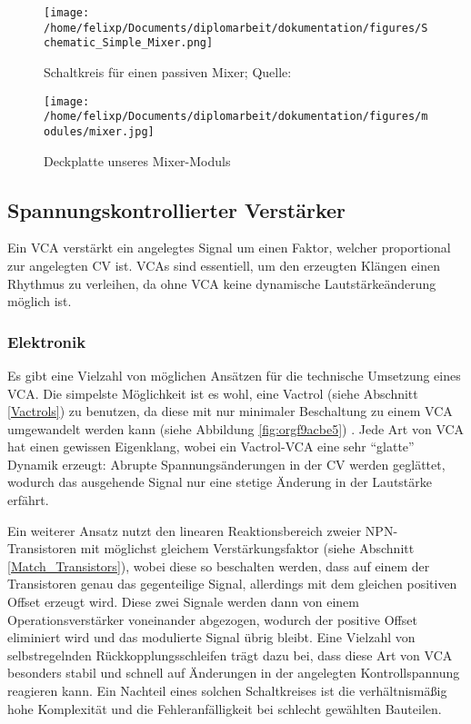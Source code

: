 \begin{figure}[htbp]
\centering
\texttt{[image: /home/felixp/Documents/diplomarbeit/dokumentation/figures/Schematic\_Simple\_Mixer.png]}
\caption{\label{fig:org15a63e5}Schaltkreis für einen passiven Mixer; Quelle: \cite{miaw:mixer}}
\end{figure}

\begin{figure}[htbp]
\centering
\texttt{[image: /home/felixp/Documents/diplomarbeit/dokumentation/figures/modules/mixer.jpg]}
\caption{\label{fig:org5626e91}Deckplatte unseres Mixer-Moduls}
\end{figure}

\newpage
\subsection{Spannungskontrollierter Verstärker \label{VCA}}
\label{sec:org9f7c0c8}
Ein \acf{VCA} verstärkt ein angelegtes Signal um einen Faktor, welcher proportional zur angelegten \acl{CV} ist. \acp{VCA} sind essentiell, um den erzeugten Klängen einen Rhythmus zu verleihen, da ohne \ac{VCA} keine dynamische Lautstärkeänderung möglich ist.

\subsubsection{Elektronik}
\label{sec:org2a7ce23}
Es gibt eine Vielzahl von möglichen Ansätzen für die technische Umsetzung eines \ac{VCA}. Die simpelste Möglichkeit ist es wohl, eine Vactrol (siehe Abschnitt \ref{Vactrols}) zu benutzen, da diese mit nur minimaler Beschaltung zu einem \ac{VCA} umgewandelt werden kann (siehe Abbildung \ref{fig:orgf9acbe5}) \cite{miaw:vca}. Jede Art von \ac{VCA} hat einen gewissen Eigenklang, wobei ein Vactrol-VCA eine sehr "`glatte"' Dynamik erzeugt: Abrupte Spannungsänderungen in der \acl{CV} werden geglättet, wodurch das ausgehende Signal nur eine stetige Änderung in der Lautstärke erfährt.

Ein weiterer Ansatz nutzt den linearen Reaktionsbereich zweier NPN-Transistoren mit möglichst gleichem Verstärkungsfaktor (siehe Abschnitt \ref{Match_Transistors}), wobei diese so beschalten werden, dass auf einem der Transistoren genau das gegenteilige Signal, allerdings mit dem gleichen positiven Offset erzeugt wird. Diese zwei Signale werden dann von einem Operationsverstärker voneinander abgezogen, wodurch der positive Offset eliminiert wird und das modulierte Signal übrig bleibt. Eine Vielzahl von selbstregelnden Rückkopplungsschleifen trägt dazu bei, dass diese Art von \ac{VCA} besonders stabil und schnell auf Änderungen in der angelegten Kontrollspannung reagieren kann. Ein Nachteil eines solchen Schaltkreises ist die verhältnismäßig hohe Komplexität und die Fehleranfälligkeit bei schlecht gewählten Bauteilen.

